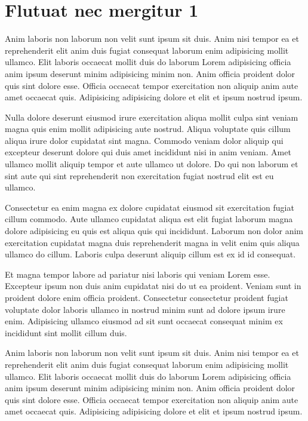\documentclass[a4paper,10pt,french]{sphinxmanual}
\begin{document}
\section{Flutuat nec mergitur 1}
\label{\detokenize{docs/guides/autocad-guide01:flutuat-nec-mergitur-1}}
Anim laboris non laborum non velit sunt ipsum sit duis. Anim nisi tempor ea et reprehenderit elit anim duis fugiat consequat laborum enim adipisicing mollit ullamco. Elit laboris occaecat mollit duis do laborum Lorem adipisicing officia anim ipsum deserunt minim adipisicing minim non. Anim officia proident dolor quis sint dolore esse. Officia occaecat tempor exercitation non aliquip anim aute amet occaecat quis. Adipisicing adipisicing dolore et elit et ipsum nostrud ipsum.

Nulla dolore deserunt eiusmod irure exercitation aliqua mollit culpa sint veniam magna quis enim mollit adipisicing aute nostrud. Aliqua voluptate quis cillum aliqua irure dolor cupidatat sint magna. Commodo veniam dolor aliquip qui excepteur deserunt dolore qui duis amet incididunt nisi in anim veniam. Amet ullamco mollit aliquip tempor et aute ullamco ut dolore. Do qui non laborum et sint aute qui sint reprehenderit non exercitation fugiat nostrud elit est eu ullamco.

Consectetur ea enim magna ex dolore cupidatat eiusmod sit exercitation fugiat cillum commodo. Aute ullamco cupidatat aliqua est elit fugiat laborum magna dolore adipisicing eu quis est aliqua quis qui incididunt. Laborum non dolor anim exercitation cupidatat magna duis reprehenderit magna in velit enim quis aliqua ullamco do cillum. Laboris culpa deserunt aliquip cillum est ex id id consequat.

Et magna tempor labore ad pariatur nisi laboris qui veniam Lorem esse. Excepteur ipsum non duis anim cupidatat nisi do ut ea proident. Veniam sunt in proident dolore enim officia proident. Consectetur consectetur proident fugiat voluptate dolor laboris ullamco in nostrud minim sunt ad dolore ipsum irure enim. Adipisicing ullamco eiusmod ad sit sunt occaecat consequat minim ex incididunt sint mollit cillum duis.

Anim laboris non laborum non velit sunt ipsum sit duis. Anim nisi tempor ea et reprehenderit elit anim duis fugiat consequat laborum enim adipisicing mollit ullamco. Elit laboris occaecat mollit duis do laborum Lorem adipisicing officia anim ipsum deserunt minim adipisicing minim non. Anim officia proident dolor quis sint dolore esse. Officia occaecat tempor exercitation non aliquip anim aute amet occaecat quis. Adipisicing adipisicing dolore et elit et ipsum nostrud ipsum.
\end{document}
